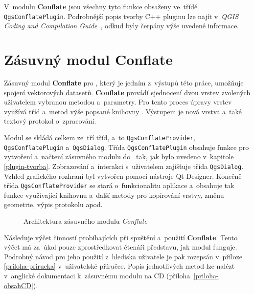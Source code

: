 V~modulu \textbf{Conflate} jsou všechny tyto funkce obsaženy ve~třídě
\texttt{Qgs\-Con\-flate\-Plugin}. 
Podrobnější popis tvorby C++ pluginu lze najít v~\textit{QGIS Coding and 
Compilation Guide}~\cite{qgisCCguide}, odkud byly čerpány výše uvedené 
informace.



\section{Zásuvný modul Conflate}
\label{plugin-navrh}

Zásuvný modul \textbf{Conflate} pro , který je jedním z~výstupů této
práce, umožňuje spojení vektorových datasetů. \textbf{Conflate} provádí 
sjednocení dvou vrstev zvolených uživa\-telem vybranou metodou a~parametry. Pro 
tento proces úpravy vrstev využívá tříd a~me\-tod vý\-še popsané knihovny . 
Výstupem je nová vrstva a~také textový protokol o~zpraco\-vání.

Modul se skládá celkem ze~tří tříd, a~to \texttt{QgsConflateProvider}, 
\texttt{QgsConflatePlugin} a~\texttt{QgsDialog}. Třída \texttt{QgsConflatePlugin} 
obsahuje funkce pro vytvoření a~načtení zásuv\-ného modulu do~ tak, jak 
bylo uvedeno v~kapitole \ref{plugin-tvorba}. Zobrazování a~interakci s~uživatelem 
zajišťuje třída \texttt{QgsDialog}. Vzhled grafického rozhraní byl vytvořen 
pomocí nástroje Qt Designer. Konečně třída \texttt{QgsConflateProvider} 
se stará o~funkcionalitu apli\-kace a~obsahuje tak funkce využívající knihovnu 
 a~další metody pro kopírování vrstvy, změnu geometrie, výpis 
protokolu apod.

\vspace{0.5cm}
  \begin{figure}[H]
    \centering
      
      \caption{Architektura zásuvného modulu \textit{Conflate}}
      \label{fig:schema}
  \end{figure} 

Následuje výčet činností probíhajících při spuštění a~použití \textbf{Conflate}.
Tento výčet má za~úkol pouze zprostředkovat čtenáři představu, jak modul funguje.
Podrobný návod pro jeho použití z~hlediska uživatele je pak rozepsán v~příloze
\ref{priloha-prirucka} v~uživatelské příručce. Popis jednotlivých metod
lze nalézt v~anglické dokumentaci k~zásuvnému modulu na CD (příloha~\ref{priloha-obsahCD}).

